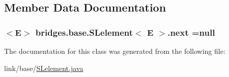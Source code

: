 \subsection{Member Data Documentation}
\hypertarget{classbridges_1_1base_1_1_s_lelement_abf61c96a74ad319d561c6952ea388e0e}{}
\subsubsection[{next}]{$<$E$>$ {\bf bridges.\+base.\+S\+Lelement}$<$ E $>$.next =null\hspace{0.3cm}{\ttfamily [protected]}}\label{classbridges_1_1base_1_1_s_lelement_abf61c96a74ad319d561c6952ea388e0e}


The documentation for this class was generated from the following file\+:\begin{DoxyCompactItemize}
\item 
link/base/\hyperlink{_s_lelement_8java}{S\+Lelement.\+java}\end{DoxyCompactItemize}

